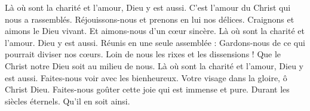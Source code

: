 Là où sont la charité et l’amour, Dieu y est aussi.
\versseparator
C’est l’amour du Christ qui nous a rassemblés.
\versseparator
Réjouissons-nous et prenons en lui nos délices.
\versseparator
Craignons et aimons le Dieu vivant.
\versseparator
Et aimons-nous d’un cœur sincère.
\versseparator
Là où sont la charité et l’amour. Dieu y est aussi.
\versseparator
Réunis en une seule assemblée :
\versseparator
Gardons-nous de ce qui pourrait diviser nos cœurs.
\versseparator
Loin de nous les rixes et les dissensions !
\versseparator
Que le Christ notre Dieu soit au milieu de nous.
\versseparator
Là où sont la charité et l’amour, Dieu y est aussi.
\versseparator
Faites-nous voir avec les bienheureux.
\versseparator
Votre visage dans la gloire, ô Christ Dieu.
\versseparator
Faites-nous goûter cette joie qui est immense et pure.
\versseparator
Durant les siècles éternels. Qu’il en soit ainsi.